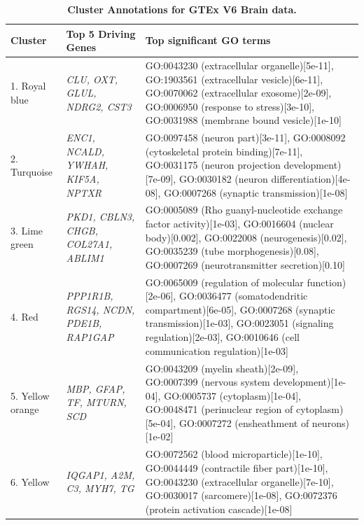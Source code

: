 \documentclass[10pt,letterpaper]{article}
\begin{document}
\begin{table}[!hp]
\begin{adjustwidth}{-2in}{0in} %
\footnotesize
\centering
\caption{\bf Cluster Annotations for GTEx V6 Brain data.}
\renewcommand{\arraystretch}{1.7}
\begin{tabular}{|p{1.0in}|p{1.5in}|p{4.3in}|}
 \hline
 Cluster & Top 5 Driving \qquad Genes  &  Top significant GO terms \\
\hline
 1. Royal blue &  \textit{CLU, OXT,  GLUL, NDRG2, CST3} & GO:0043230 (extracellular organelle)[5e-11], GO:1903561 (extracellular vesicle)[6e-11], GO:0070062 (extracellular exosome)[2e-09], GO:0006950 (response to stress)[3e-10], GO:0031988 (membrane bound vesicle)[1e-10] \\
 \hline
2. Turquoise & \textit{ENC1, NCALD, YWHAH, KIF5A, NPTXR} & GO:0097458 (neuron part)[3e-11], GO:0008092 (cytoskeletal protein binding)[7e-11], GO:0031175 (neuron projection development)[7e-09], GO:0030182 (neuron differentiation)[4e-08], GO:0007268 (synaptic transmission)[1e-08] \\
\hline
 3. Lime green & \textit{PKD1, CBLN3, CHGB, COL27A1, ABLIM1} & GO:0005089 (Rho guanyl-nucleotide exchange factor activity)[1e-03], GO:0016604 (nuclear body)[0.002], GO:0022008 (neurogenesis)[0.02], GO:0035239 (tube morphogenesis)[0.08], GO:0007269 (neurotransmitter secretion)[0.10] \\
\hline
4. Red & \textit{PPP1R1B, RGS14, NCDN, PDE1B, RAP1GAP} & GO:0065009 (regulation of molecular function)[2e-06], GO:0036477 (somatodendritic compartment)[6e-05], GO:0007268 (synaptic transmission)[1e-03], GO:0023051 (signaling regulation)[2e-03], GO:0010646 (cell communication regulation)[1e-03] \\
\hline
5. Yellow orange & \textit{MBP, GFAP, TF, MTURN, SCD} & GO:0043209 (myelin sheath)[2e-09], GO:0007399 (nervous system development)[1e-04], GO:0005737 (cytoplasm)[1e-04], GO:0048471 (perinuclear region of cytoplasm)[5e-04], GO:0007272 (ensheathment of neurons)[1e-02] \\
\hline
6. Yellow & \textit{IQGAP1, A2M, C3, MYH7, TG} & GO:0072562 (blood microparticle)[1e-10], GO:0044449 (contractile fiber part)[1e-10], GO:0043230 (extracellular organelle)[7e-10], GO:0030017 (sarcomere)[1e-08], GO:0072376 (protein activation cascade)[1e-08] \\
\hline
\end{tabular} \label{tab2}
\end{adjustwidth}
 \end{table}
\end{document}
